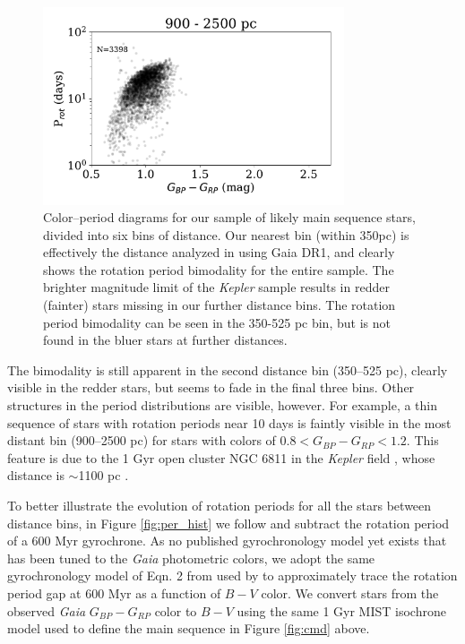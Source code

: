 \documentclass[preprint2]{aastex62}
\newcommand{\Kepler}{\textsl{Kepler}\xspace}
\begin{document}
\begin{figure}[]
\includegraphics[width=3.5in]{../figures/rot_dist_900}
\caption{Color--period diagrams for our sample of likely main sequence stars, divided into six bins of distance. Our nearest bin (within 350pc) is effectively the distance analyzed in \citet{davenport2017} using Gaia DR1, and clearly shows the rotation period bimodality for the entire sample. The brighter magnitude limit of the \Kepler sample results in redder (fainter) stars missing in our further distance bins. The rotation period bimodality can be seen in the 350-525 pc bin, but is not found in the bluer stars at further distances.
}
\label{fig:color_period}
\end{figure}


The bimodality is still apparent in the second distance bin (350--525 pc), clearly visible in the redder stars, but seems to fade in the final three bins. Other structures in the period distributions are visible, however. For example, a thin sequence of stars with rotation periods near 10 days is faintly visible in the most distant bin (900--2500 pc) for stars with colors of $0.8<G_{BP}-G_{RP}<1.2$. This feature is due to the 1 Gyr open cluster NGC 6811 in the \Kepler field \citep{meibom2011}, whose distance is $\sim$1100 pc \citep{sandquist2016}.


To better illustrate the evolution of rotation periods for all the stars between distance bins, in Figure \ref{fig:per_hist} we follow \citet{davenport2017} and subtract the rotation period of a 600 Myr gyrochrone. As no published gyrochronology model yet exists that has been tuned to the {\em Gaia} photometric colors, we adopt the same gyrochronology model of Eqn. 2 from \citet{meibom2009} used by \citet{davenport2017} to approximately trace the rotation period gap at 600 Myr as a function of $B-V$ color. We convert stars from the observed {\em Gaia} $G_{BP}-G_{RP}$ color to $B-V$ using the same 1 Gyr MIST isochrone model used to define the main sequence in Figure \ref{fig:cmd} above. 
\end{document}
